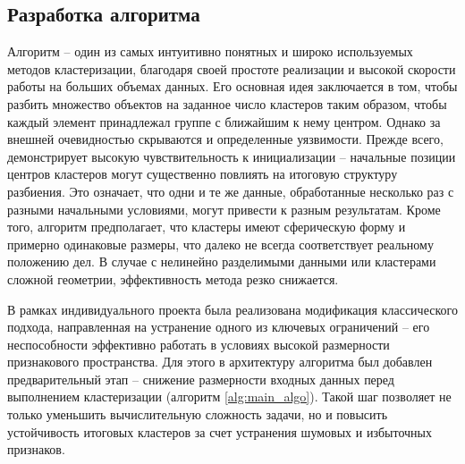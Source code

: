     \subsection{Разработка алгоритма}

        Алгоритм \kmeans{} -- один из самых интуитивно понятных и широко используемых методов кластеризации, благодаря своей простоте реализации и высокой скорости работы на больших объемах данных. Его основная идея заключается в том, чтобы разбить множество объектов на заданное число кластеров таким образом, чтобы каждый элемент принадлежал группе с ближайшим к нему центром. Однако за внешней очевидностью скрываются и определенные уязвимости. Прежде всего, \kmeans{} демонстрирует высокую чувствительность к инициализации -- начальные позиции центров кластеров могут существенно повлиять на итоговую структуру разбиения. Это означает, что одни и те же данные, обработанные несколько раз с разными начальными условиями, могут привести к разным результатам. Кроме того, алгоритм предполагает, что кластеры имеют сферическую форму и примерно одинаковые размеры, что далеко не всегда соответствует реальному положению дел. В случае с нелинейно разделимыми данными или кластерами сложной геометрии, эффективность метода резко снижается.

        В рамках индивидуального проекта была реализована модификация классического подхода, направленная на устранение одного из ключевых ограничений -- его неспособности эффективно работать в условиях высокой размерности признакового пространства. Для этого в архитектуру алгоритма был добавлен предварительный этап -- снижение размерности входных данных перед выполнением кластеризации (алгоритм \ref{alg:main_algo}). Такой шаг позволяет не только уменьшить вычислительную сложность задачи, но и повысить устойчивость итоговых кластеров за счет устранения шумовых и избыточных признаков.

